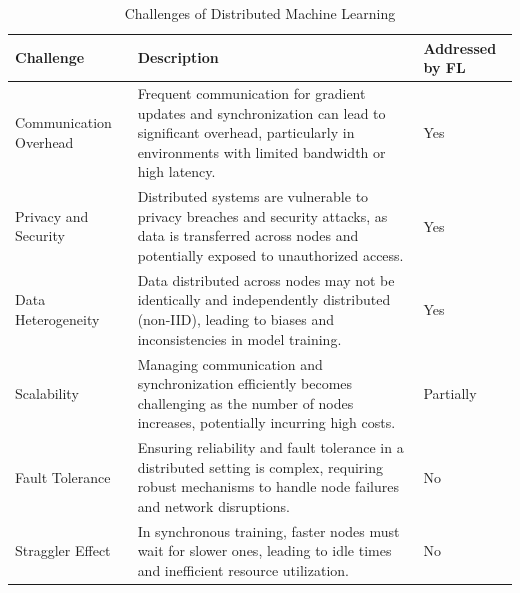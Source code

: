 \begin{table}[h!]
    \centering
    \begin{tabular}{>{\raggedright}p{4cm} >{\raggedright}p{7cm} >{\raggedright\arraybackslash}p{3cm}}
        \toprule
        \rowcolor{lightgray}
        \textbf{Challenge}     & \textbf{Description}                                                                                                                                                   & \textbf{Addressed by FL} \\
        \midrule
        Communication Overhead & Frequent communication for gradient updates and synchronization can lead to significant overhead, particularly in environments with limited bandwidth or high latency. & Yes                      \\
        \midrule
        Privacy and Security   & Distributed systems are vulnerable to privacy breaches and security attacks, as data is transferred across nodes and potentially exposed to unauthorized access.       & Yes                      \\
        \midrule
        Data Heterogeneity     & Data distributed across nodes may not be identically and independently distributed (non-IID), leading to biases and inconsistencies in model training.                 & Yes                      \\
        \midrule
        Scalability            & Managing communication and synchronization efficiently becomes challenging as the number of nodes increases, potentially incurring high costs.                         & Partially                \\
        \midrule
        Fault Tolerance        & Ensuring reliability and fault tolerance in a distributed setting is complex, requiring robust mechanisms to handle node failures and network disruptions.             & No                       \\
        \midrule
        Straggler Effect       & In synchronous training, faster nodes must wait for slower ones, leading to idle times and inefficient resource utilization.                                           & No                       \\
        \bottomrule
    \end{tabular}
    \caption{Challenges of Distributed Machine Learning}
    \label{tab:dml_challenges}
\end{table}


